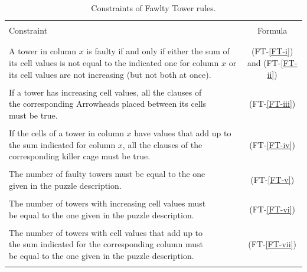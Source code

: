 \begin{table}[hb!]
    \centering
    \begin{tabular*}{\textwidth}{l @{\extracolsep{\fill}} c}
        \hline
        \\
        Constraint &Formula\\
        \\
        \hline
        \\
        \makecell[cl]{A tower in column $x$ is faulty if and only if either the\\
        sum of its cell values is not equal to the indicated one\\
        for column $x$ or its cell values are not increasing (but\\
        not both at once).} & (FT-\ref{FT-i}) and (FT-\ref{FT-ii})\\
        \\
        \makecell[cl]{If a tower has increasing cell values, all the clauses of\\
        the corresponding Arrowheads placed between its cells\\
        must be true.} & (FT-\ref{FT-iii})\\
        \\
        \makecell[cl]{If the cells of a tower in column $x$ have values that add\\
        up to the sum indicated for column $x$, all the\\
        clauses of the corresponding killer cage must be true.} & (FT-\ref{FT-iv})\\
        \\
        \makecell[cl]{The number of faulty towers must be equal to the one\\
        given in the puzzle description.} & (FT-\ref{FT-v})\\
        \\
        \makecell[cl]{The number of towers with increasing cell values must\\
        be equal to the one given in the puzzle description.} & (FT-\ref{FT-vi})\\
        \\
        \makecell[cl]{The number of towers with cell values that add up to\\
        the sum indicated for the corresponding column must\\
        be equal to the one given in the puzzle description.} & (FT-\ref{FT-vii})\\
        \\
        \hline
    \end{tabular*}
        \caption{Constraints of Fawlty Tower rules.}
    \label{Constraints:FawltyTowers}
\end{table}

